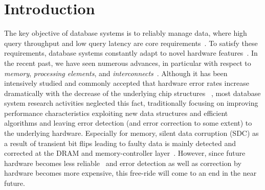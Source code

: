 
\vspace{-0.3cm}
\section{Introduction}
\label{sec:Introduction}


The key objective of database systems is to reliably manage data, where high query throughput and low query latency are core requirements~\cite{BeckmanReport2016}. To satisfy these requirements, database systems constantly adapt to novel hardware features~\cite{DBLP:journals/cacm/BonczKM08,DBLP:conf/sigmod/BressFT16,DBLP:conf/sigmod/DoKPPPD13,DBLP:journals/pvldb/KarnagelHL17,DBLP:conf/sigmod/LiDSN16,DBLP:conf/sigmod/OukidLNWL16}. In the recent past, we have seen numerous advances, in particular with respect to \emph{memory}, \emph{processing elements}, and \emph{interconnects}~\cite{DBLP:journals/cacm/BorkarC11,DBLP:journals/dt/Henkel17b,DBLP:conf/micro/Pollack99}. Although it has been intensively studied and commonly accepted that hardware error rates increase dramatically with the decrease of the underlying chip structures ~\cite{DBLP:journals/micro/Borkar05,DBLP:conf/dac/HenkelBDGNSTW13,DBLP:conf/mtdt/SpicaM04}, most database system research activities neglected this fact, traditionally focusing on improving performance characteristics exploiting new data structures and efficient algorithms and leaving error detection (and error correction to some extent) to the underlying hardware. Especially for memory, silent data corruption (SDC) as a result of transient bit flips leading to faulty data is mainly detected and corrected at the DRAM and memory-controller layer~\cite{DBLP:conf/mtdt/SpicaM04}. However, since future hardware becomes less reliable~\cite{DBLP:conf/dac/HenkelBDGNSTW13,DBLP:books/daglib/0037372,DBLP:journals/it/ShafiqueABCCDEH15} and error detection as well as correction by hardware becomes more expensive, this free-ride will come to an end in the near future.

